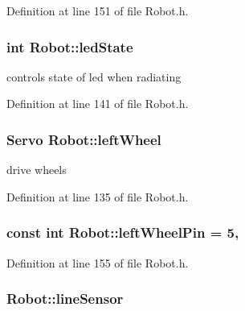 Definition at line 151 of file Robot.\-h.

\hypertarget{classRobot_a3c7308c71db125a8840f9c82b5fec9ca}{
\subsubsection[{led\-State}]{\setlength{\rightskip}{0pt plus 5cm}int Robot\-::led\-State\hspace{0.3cm}{\ttfamily [private]}}}\label{classRobot_a3c7308c71db125a8840f9c82b5fec9ca}


controls state of led when radiating 



Definition at line 141 of file Robot.\-h.

\hypertarget{classRobot_af357e059c6c07190c92c6c9a00e2b8af}{
\subsubsection[{left\-Wheel}]{\setlength{\rightskip}{0pt plus 5cm}Servo Robot\-::left\-Wheel\hspace{0.3cm}{\ttfamily [private]}}}\label{classRobot_af357e059c6c07190c92c6c9a00e2b8af}


drive wheels 



Definition at line 135 of file Robot.\-h.

\hypertarget{classRobot_a46298d7fb4c8c3932221c6a5ac14af9d}{
\subsubsection[{left\-Wheel\-Pin}]{\setlength{\rightskip}{0pt plus 5cm}const int Robot\-::left\-Wheel\-Pin = 5\hspace{0.3cm}{\ttfamily [static]}, {\ttfamily [private]}}}\label{classRobot_a46298d7fb4c8c3932221c6a5ac14af9d}


Definition at line 155 of file Robot.\-h.

\hypertarget{classRobot_abdc300045bea9a31013b25682629752d}{
\subsubsection[{line\-Sensor}]{ Robot\-::line\-Sensor}}\label{classRobot_abdc300045bea9a31013b25682629752d}


